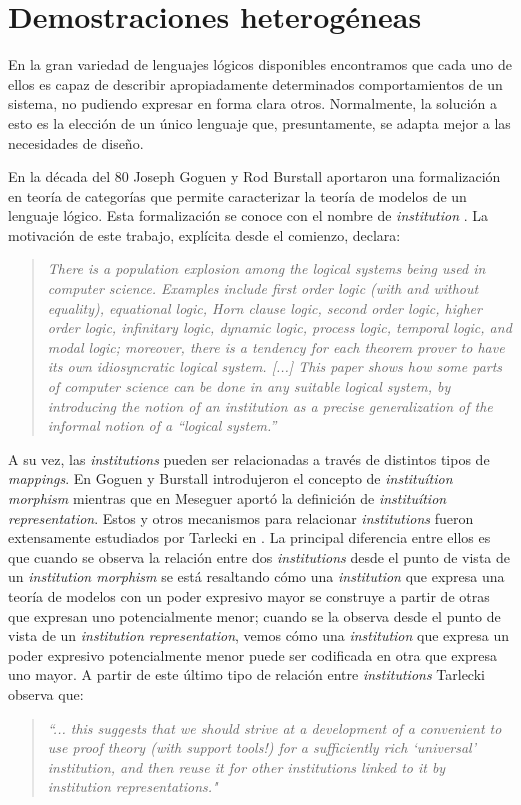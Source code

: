 \section{Demostraciones heterogéneas}
\label{heterogenious proofs}

En la gran variedad de lenguajes lógicos disponibles encontramos que cada uno de ellos es capaz de describir apropiadamente determinados comportamientos de un sistema, no pudiendo expresar en forma clara otros. Normalmente, la solución a esto es la elección de un único lenguaje que, presuntamente, se adapta mejor a las necesidades de diseño. 

En la década del 80 Joseph Goguen y Rod Burstall aportaron una formalización en teoría de categorías que permite caracterizar la teoría de modelos de un lenguaje lógico. Esta formalización se conoce con el nombre de \emph{institution} \cite{goguen:cmwlp84}. La motivación de este trabajo, explícita desde el comienzo, declara: 
\begin{quotation} \em
There is a population explosion among the logical systems being used in computer science. Examples include first order logic (with and without equality), equational logic, Horn clause logic, second order logic, higher order logic, infinitary logic, dynamic logic, process logic, temporal logic, and modal logic; moreover, there is a tendency for each theorem prover to have its own idiosyncratic logical system. [...] This paper shows how some parts of computer science can be done in any suitable logical system, by introducing the notion of an institution as a precise generalization of the informal notion of a ``logical system.''
\end{quotation}

A su vez, las \emph{institutions} pueden ser relacionadas a través de distintos tipos de \emph{mappings}. En \cite{goguen:jacm-39_1} Goguen y Burstall introdujeron el concepto de \emph{instituítion morphism} mientras que en \cite{meseguer:lc87} Meseguer aportó la definición de \emph{instituítion representation}. Estos y otros mecanismos para relacionar \emph{institutions} fueron extensamente estudiados por Tarlecki en \cite{tarlecki:sadt-rtdts95}. La principal diferencia entre ellos es que cuando se observa la relación entre dos \emph{institutions} desde el punto de vista de un \emph{institution morphism} se está resaltando cómo una \emph{institution} que expresa una teoría de modelos con un poder expresivo mayor se construye a partir de otras que expresan uno potencialmente menor; cuando se la observa desde el punto de vista de un \emph{institution representation}, vemos cómo una \emph{institution} que expresa un poder expresivo potencialmente menor puede ser codificada en otra que expresa uno mayor. A partir de este último tipo de relación entre \emph{institutions} Tarlecki observa que:
\begin{quotation} \em
``... this suggests that we should strive at a development of a convenient to use proof theory (with support tools!) for a sufficiently rich `universal' institution, and then reuse it for other institutions linked to it by institution representations."
\end{quotation}

